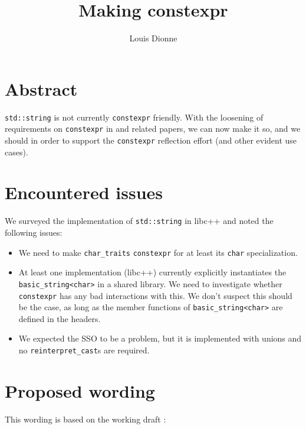 \documentclass{wg21}
\title{Making \cc{std::string} constexpr}
\author{Louis Dionne}{ldionne@apple.com}
\newcommand{\cc}[1]{\texttt{#1}}
\begin{document}
\maketitle

\section{Abstract}
\cc{std::string} is not currently \cc{constexpr} friendly. With the loosening
of requirements on \cc{constexpr} in \cite{P0784R1} and related papers, we
can now make it so, and we should in order to support the \cc{constexpr}
reflection effort (and other evident use cases).


\section{Encountered issues}
We surveyed the implementation of \cc{std::string} in libc++ and noted the
following issues:
\begin{itemize}
  \item We need to make \cc{char_traits} \cc{constexpr} for at least its
        \cc{char} specialization.
  \item At least one implementation (libc++) currently explicitly instantiates
        the \cc{basic_string<char>} in a shared library. We need to investigate
        whether \cc{constexpr} has any bad interactions with this. We don't
        suspect this should be the case, as long as the member functions of
        \cc{basic_string<char>} are defined in the headers.
  \item We expected the SSO to be a problem, but it is implemented with unions
        and no \cc{reinterpret_cast}s are required.
\end{itemize}


\section{Proposed wording}
This wording is based on the working draft \cite{N4727}:
\end{document}
